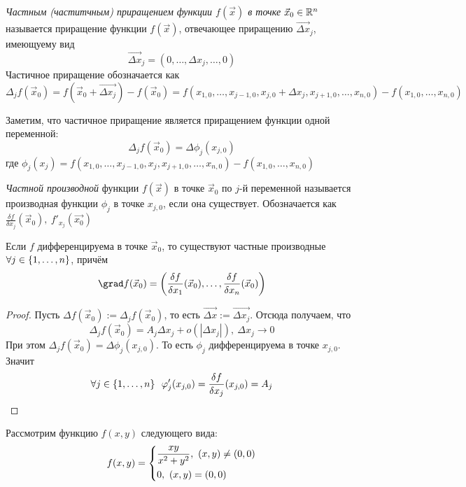 \begin{definition}
	\textit{Частным (частитчным) приращением функции $f(\vec{x})$ в точке} $\vec{x}_0 \in \mathbb{R}^n$ называется приращение функции $f(\vec{x})$, отвечающее 	приращению $\overrightarrow{\Delta x}_j$, имеющуему вид
	\[
		\overrightarrow{\Delta x}_j = (0, \ldots, \Delta x_j, \ldots, 0)
	\]
	Частичное приращение обозначается как
	\[
		\Delta_j f(\vec{x}_0) = f(\vec{x}_0 + \overrightarrow{\Delta x_j}) - f(\vec{x}_0) = f(x_{1, 0}, \ldots, x_{j - 1, 0}, x_{j, 0} + \Delta x_j, x_{j + 1, 0}, \ldots, x_{n, 0}) - f(x_{1, 0}, \ldots, x_{n, 0})
	\]
\end{definition}

\begin{note}
	Заметим, что частичное приращение является приращением функции одной переменной:
	\[
		\Delta_j f(\vec{x}_0) = \Delta \phi_j (x_{j, 0})
	\]
	где $\phi_j(x_j) = f(x_{1, 0}, \ldots, x_{j - 1, 0}, x_j, x_{j + 1, 0}, \ldots, x_{n, 0}) - f(x_{1, 0}, \ldots, x_{n, 0})$
\end{note}

\begin{definition}
	\textit{Частной производной} функции $f(\vec{x})$ в точке $\vec{x}_0$ по $j$-й переменной называется производная функции $\phi_j$ в точке $x_{j, 0}$, если она существует. Обозначается как $\frac{\delta f}{\delta x_j}(\vec{x}_0),\ f'_{x_j}(\vec{x_0})$
\end{definition}

\begin{theorem}
	Если $f$ дифференцируема в точке $\vec{x}_0$, то существуют частные производные $\forall j \in \{1, \ldots, n\}$, причём
	\[
		\grad f(\vec{x}_0) = \left(\frac{\delta f}{\delta x_1}(\vec{x}_0), \ldots, \frac{\delta f}{\delta x_n}(\vec{x}_0)\right)
	\]
\end{theorem}

\begin{proof}
	Пусть $\Delta f(\vec{x}_0) := \Delta_j f(\vec{x}_0)$, то есть $\overrightarrow{\Delta x} := \overrightarrow{\Delta x_j}$. Отсюда получаем, что
	\[
		\Delta_j f(\vec{x}_0) = A_j \Delta x_j + o(|\Delta x_j|),\ \Delta x_j \to 0
	\]
	При этом $\Delta_j f(\vec{x}_0) = \Delta \phi_j (x_{j, 0})$. То есть $\phi_j$ дифференцируема в точке $x_{j, 0}$. Значит
	\[
		\forall j \in \{1, \ldots, n\}\ \ \varphi'_j (x_{j, 0}) = \frac{\delta f}{\delta x_j} (x_{j, 0}) = A_j
	\]
\end{proof}

\begin{example}
	Рассмотрим функцию $f(x, y)$ следующего вида:
	\[
		f(x, y) = \left\{\begin{aligned}
			&{\frac{xy}{x^2 + y^2},\ (x, y) \neq (0, 0)}
			\\
			&{0,\ (x, y) = (0, 0)}
		\end{aligned}\right.
	\]
\end{example}

